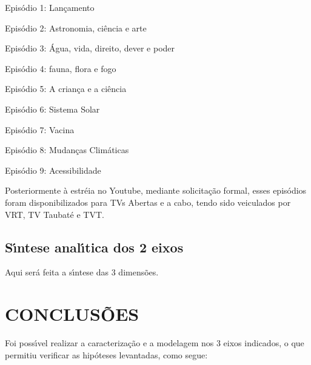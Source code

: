 \documentclass[
12pt,		%
openright,	%
twoside,  %
a4paper,			%
chapter=TITLE,		%
english,			%
french,				%
spanish,			%
brazil				%
]{USPSC-classe/USPSC}
\begin{document}
\begin{alineas}
\item Epis\'odio 1: Lan\c{c}amento
\item Epis\'odio 2: Astronomia, ci\^encia e arte
\item Epis\'odio 3: \'Agua, vida, direito, dever e poder
\item Epis\'odio 4: fauna, flora e fogo
\item Epis\'odio 5: A crian\c{c}a e a ci\^encia
\item Epis\'odio 6: Sistema Solar
\item Epis\'odio 7: Vacina
\item Epis\'odio 8: Mudan\c{c}as Clim\'aticas
\item Epis\'odio 9: Acessibilidade
\end{alineas}

Posteriormente \`a estr\'eia no Youtube, mediante solicita\c{c}\~ao formal, esses epis\'odios foram disponibilizados para TVs Abertas e \textquotedbl a cabo\textquotedbl , tendo sido veiculados por VRT, TV Taubat\'e e TVT.

















\section[S\'{\i}ntese anal\'{\i}tica dos 2 eixos]{S\'{\i}ntese anal\'{\i}tica dos 2 eixos}\label{S\'{\i}ntese anal\'{\i}tica dos 2 eixos}
Aqui ser\'a feita a s\'{\i}ntese das 3 dimens\~oes.

















\chapter[CONCLUS\~OES]{CONCLUS\~OES}\label{CONCLUS\~OES}
Foi poss\'{\i}vel realizar a caracteriza\c{c}\~ao e a modelagem nos 3 eixos indicados, o que permitiu verificar as hip\'oteses levantadas, como segue:
\end{document}
